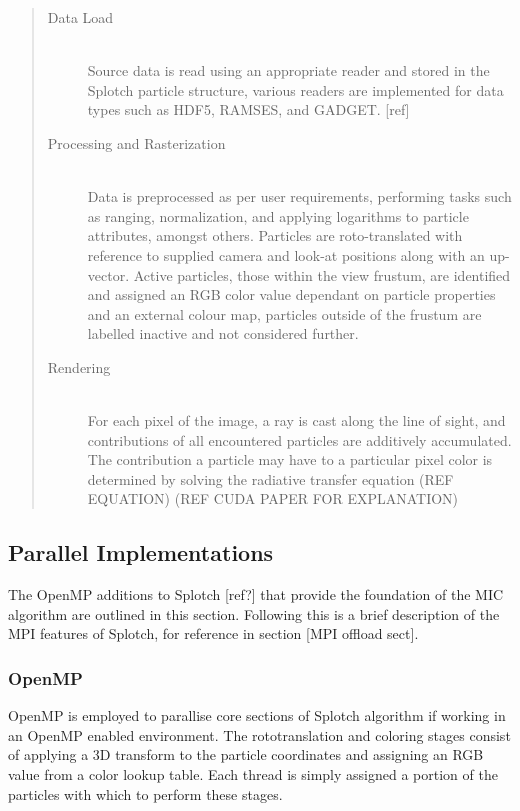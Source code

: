 \documentclass[runningheads,a4paper]{llncs}
\begin{document}
\begin{quote} %
\begin{description}
  \item[Data Load] \hfill \\
  Source data is read using an appropriate reader and stored in the Splotch particle structure, various readers are 
  implemented for data types such as HDF5, RAMSES, and GADGET. [ref]
  \item[Processing and Rasterization] \hfill \\
   Data is preprocessed as per user requirements, performing tasks such as ranging, normalization, and applying 
   logarithms to particle attributes, amongst others. Particles are roto-translated with reference to supplied 
   camera and look-at positions along with an up-vector. Active particles, those within the view frustum, are 
   identified and assigned an RGB color value dependant on particle properties and an external colour map, 
   particles outside of the frustum are labelled inactive and not  considered further.  
  \item[Rendering] \hfill \\
  For each pixel of the image, a ray is cast along the line of sight, and contributions of all encountered particles 
  are additively accumulated. The contribution a particle may have to a particular pixel color is determined by solving 
  the radiative transfer equation (REF EQUATION) (REF CUDA PAPER FOR EXPLANATION)
\end{description}
\end{quote}

\subsection{Parallel Implementations}
\label{sect:mpiopenmp}

The OpenMP additions to Splotch [ref?] that provide the foundation of the MIC algorithm are outlined in this section. 
Following this is a brief description of the MPI features of Splotch, for reference in section [MPI 
offload sect].

\subsubsection{OpenMP}
\label{sect:ompsplotch}

OpenMP is employed to parallise core sections of Splotch algorithm if working in an OpenMP enabled environment. 
The rototranslation and coloring stages consist of applying a 3D transform to the particle coordinates and assigning 
an RGB value from a color lookup table. Each thread is simply assigned a portion of the particles with which to 
perform these stages.
\end{document}
